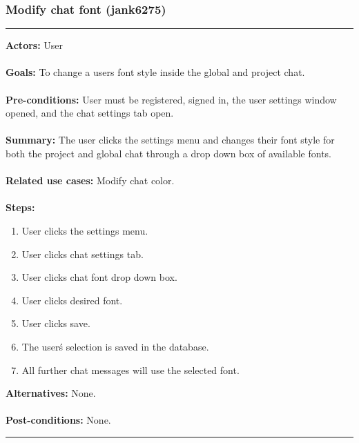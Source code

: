 \documentclass[11pt]{report}
\begin{document}
\subsubsection{Modify chat font (jank6275)}
\vspace{2pt}
\hrule
\vspace{8pt}
 \textbf{Actors:} User \\ \\
\textbf{Goals:} To change a users font style inside the global and project chat. \\ \\
 \textbf{Pre-conditions:} User must be registered, signed in, the user settings window opened, and the chat settings tab open.  \\ \\
 \textbf{Summary:} The user clicks the settings menu and changes their font style for both the project and global chat through a drop down box of available fonts. \\ \\
\textbf{Related use cases:} Modify chat color. \\ \\
\textbf{Steps:} \begin{enumerate}
  \item User clicks the settings menu.
  \item User clicks chat settings tab.
  \item User clicks chat font drop down box.
  \item User clicks desired font.
  \item User clicks save.
  \item The user\'s selection is saved in the database.
  \item All further chat messages will use the selected font.
 \end{enumerate}
 \textbf{Alternatives:} None. \\ \\
 \textbf{Post-conditions:} None. \\
\vspace{8pt}
\hrule
\newpage
\end{document}
